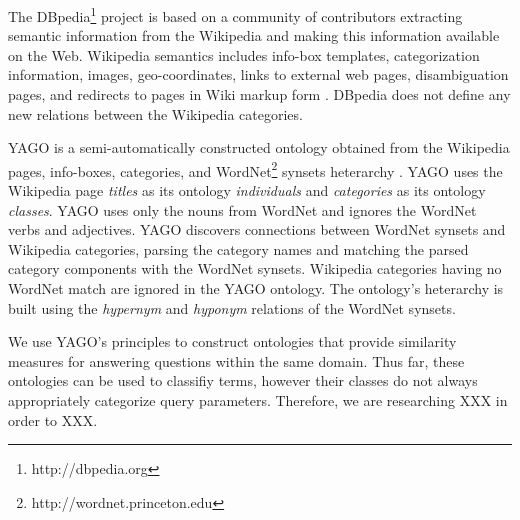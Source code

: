 
The DBpedia\footnote{http://dbpedia.org} project is based on a community of contributors extracting semantic information from the Wikipedia and making this information available on the Web.  Wikipedia semantics includes info-box templates, categorization information,  images, geo-coordinates, links to external web pages, disambiguation pages, and redirects to pages in Wiki markup form \cite{Bizer2009}.  DBpedia does not define any new relations between the Wikipedia categories.  


YAGO is a semi-automatically constructed ontology obtained from the Wikipedia pages, info-boxes, categories, and WordNet\footnote{http://wordnet.princeton.edu} synsets heterarchy \cite{Suchanek2009phd}. YAGO uses the Wikipedia page \emph{titles} as its ontology \emph{individuals} and \emph{categories} as its ontology \emph{classes}. YAGO uses only the nouns from WordNet and ignores the WordNet verbs and adjectives.  YAGO discovers connections between WordNet synsets and Wikipedia categories, parsing the category names and matching the parsed category components with the WordNet synsets.  Wikipedia categories having no WordNet match are ignored in the YAGO ontology.  The ontology's heterarchy is built using the \textit{hypernym} and \textit{hyponym} relations of the WordNet synsets.  

We use YAGO's principles to construct ontologies that provide similarity measures for answering questions within the same domain.  Thus far, these ontologies can be used to classifiy terms, however their classes do not always appropriately categorize query parameters.  Therefore, we are researching XXX in order to XXX.%
 


